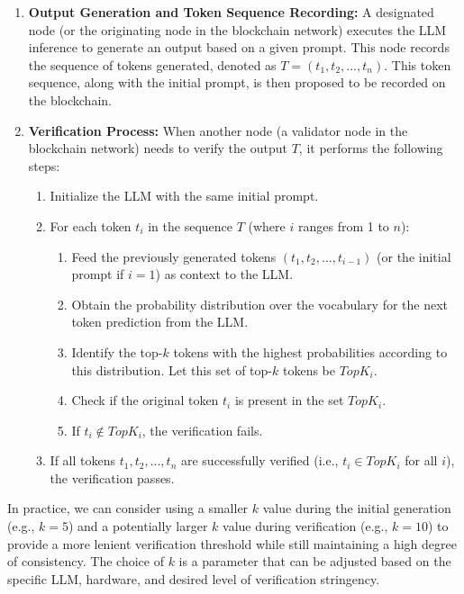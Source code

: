 \documentclass{article}
\begin{document}
\begin{enumerate}
    \item \textbf{Output Generation and Token Sequence Recording:}  A designated node (or the originating node in the blockchain network) executes the LLM inference to generate an output based on a given prompt.  This node records the sequence of tokens generated, denoted as $T = (t_1, t_2, ..., t_n)$.  This token sequence, along with the initial prompt, is then proposed to be recorded on the blockchain.

    \item \textbf{Verification Process:}  When another node (a validator node in the blockchain network) needs to verify the output $T$, it performs the following steps:
    \begin{enumerate}
        \item Initialize the LLM with the same initial prompt.
        \item For each token $t_i$ in the sequence $T$ (where $i$ ranges from 1 to $n$):
        \begin{enumerate}
            \item Feed the previously generated tokens $(t_1, t_2, ..., t_{i-1})$ (or the initial prompt if $i=1$) as context to the LLM.
            \item Obtain the probability distribution over the vocabulary for the next token prediction from the LLM.
            \item Identify the top-$k$ tokens with the highest probabilities according to this distribution.  Let this set of top-$k$ tokens be $TopK_i$.
            \item Check if the original token $t_i$ is present in the set $TopK_i$.
            \item If $t_i \notin TopK_i$, the verification fails.
        \end{enumerate}
        \item If all tokens $t_1, t_2, ..., t_n$ are successfully verified (i.e., $t_i \in TopK_i$ for all $i$), the verification passes.
    \end{enumerate}
\end{enumerate}

In practice, we can consider using a smaller $k$ value during the initial generation (e.g., $k=5$) and a potentially larger $k$ value during verification (e.g., $k=10$) to provide a more lenient verification threshold while still maintaining a high degree of consistency.  The choice of $k$ is a parameter that can be adjusted based on the specific LLM, hardware, and desired level of verification stringency.
\end{document}
